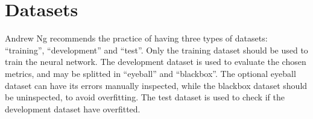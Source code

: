 



\section{Datasets}

Andrew Ng recommends the practice of having three types of datasets: ``training'', ``development'' and ``test''. Only the training dataset should be used to train the neural network. The development dataset is used to evaluate the chosen metrics, and may be splitted in ``eyeball'' and ``blackbox''. The optional eyeball dataset can have its errors manually inspected, while the blackbox dataset should be uninspected, to avoid overfitting. The test dataset is used to check if the development dataset have overfitted.

